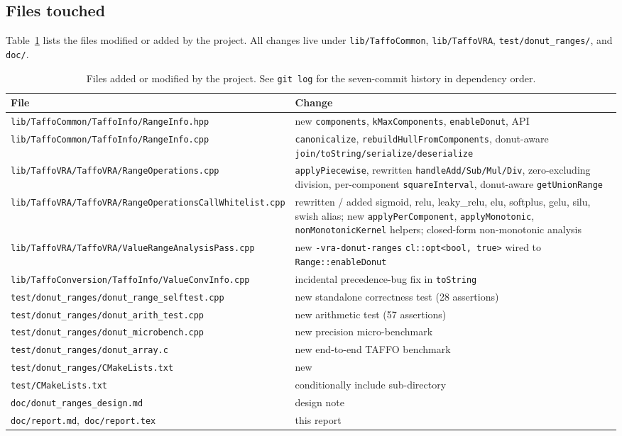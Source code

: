 \documentclass[11pt,a4paper]{article}
\theoremstyle{plain}
\begin{document}
\subsection{Files touched}

Table~\ref{tab:files} lists the files modified or added by the
project. All changes live under \texttt{lib/TaffoCommon},
\texttt{lib/TaffoVRA}, \texttt{test/donut\_ranges/}, and \texttt{doc/}.

\begin{table}[H]
\centering
\footnotesize
\begin{tabularx}{\linewidth}{@{}p{7cm}X@{}}
\toprule
File & Change \\
\midrule
\texttt{lib/TaffoCommon/TaffoInfo/RangeInfo.hpp} &
  new \texttt{components}, \texttt{kMaxComponents}, \texttt{enableDonut}, API \\
\texttt{lib/TaffoCommon/TaffoInfo/RangeInfo.cpp} &
  \texttt{canonicalize}, \texttt{rebuildHullFromComponents}, donut-aware
  \texttt{join/toString/serialize/deserialize} \\
\texttt{lib/TaffoVRA/TaffoVRA/RangeOperations.cpp} &
  \texttt{applyPiecewise}, rewritten \texttt{handleAdd/Sub/Mul/Div},
  zero-excluding division, per-component \texttt{squareInterval},
  donut-aware \texttt{getUnionRange} \\
\texttt{lib/TaffoVRA/TaffoVRA/RangeOperationsCallWhitelist.cpp} &
  rewritten / added sigmoid, relu, leaky\_relu, elu, softplus, gelu,
  silu, swish alias; new \texttt{applyPerComponent},
  \texttt{applyMonotonic}, \texttt{nonMonotonicKernel} helpers;
  closed-form non-monotonic analysis \\
\texttt{lib/TaffoVRA/TaffoVRA/ValueRangeAnalysisPass.cpp} &
  new \texttt{-vra-donut-ranges} \texttt{cl::opt<bool, true>} wired to
  \texttt{Range::enableDonut} \\
\texttt{lib/TaffoConversion/TaffoInfo/ValueConvInfo.cpp} &
  incidental precedence-bug fix in \texttt{toString} \\
\texttt{test/donut\_ranges/donut\_range\_selftest.cpp} &
  new standalone correctness test (28 assertions) \\
\texttt{test/donut\_ranges/donut\_arith\_test.cpp} &
  new arithmetic test (57 assertions) \\
\texttt{test/donut\_ranges/donut\_microbench.cpp} &
  new precision micro-benchmark \\
\texttt{test/donut\_ranges/donut\_array.c} &
  new end-to-end TAFFO benchmark \\
\texttt{test/donut\_ranges/CMakeLists.txt} &
  new \\
\texttt{test/CMakeLists.txt} &
  conditionally include sub-directory \\
\texttt{doc/donut\_ranges\_design.md} &
  design note \\
\texttt{doc/report.md},\ \texttt{doc/report.tex} &
  this report \\
\bottomrule
\end{tabularx}
\caption{Files added or modified by the project. See \texttt{git log} for
the seven-commit history in dependency order.}
\label{tab:files}
\end{table}
\end{document}
